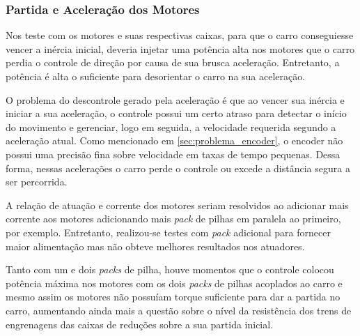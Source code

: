 		\subsubsection{Partida e Aceleração dos Motores}
			Nos teste com os motores e suas respectivas caixas, para que o carro conseguiesse vencer a inércia inicial, deveria injetar uma potência alta nos motores que o carro perdia o controle de direção por causa de sua brusca aceleração. Entretanto, a potência é alta o suficiente para desorientar o carro na sua aceleração.%

			O problema do descontrole gerado pela aceleração é que ao vencer sua inércia e iniciar a sua aceleração, o controle possui um certo atraso para detectar o início do movimento e gerenciar, logo em seguida, a velocidade requerida segundo a aceleração atual. Como mencionado em \ref{sec:problema_encoder}, o encoder não possui uma precisão fina sobre velocidade em taxas de tempo pequenas. Dessa forma, nessas acelerações o carro perde o controle ou excede a distância segura a ser percorrida.

			A relação de atuação e corrente dos motores seriam resolvidos ao adicionar mais corrente aos motores adicionando mais \textit{pack} de pilhas em paralela ao primeiro, por exemplo. Entretanto, realizou-se testes com \textit{pack} adicional para fornecer maior alimentação mas não obteve melhores resultados nos atuadores.

			Tanto com um e dois \textit{packs} de pilha, houve momentos que o controle colocou potência máxima nos motores com os dois \textit{packs} de pilhas acoplados ao carro e mesmo assim os motores não possuíam torque suficiente para dar a partida no carro, aumentando ainda mais a questão sobre o nível da resistência dos trens de engrenagens das caixas de reduções sobre a sua partida inicial.

